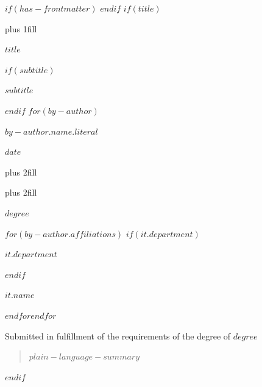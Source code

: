 $if(has-frontmatter)$
\frontmatter
$endif$
$if(title)$
\cleardoublepage
\thispagestyle{empty}
{\centering
\hbox{}\vskip 0cm plus 1fill
{\mytitlefont \Huge\bfseries $title$ \par}
$if(subtitle)$
\vspace{3ex}
{\Large\bfseries $subtitle$ \par}
$endif$
\vspace{6ex}
$for(by-author)$
{\Large\bfseries $by-author.name.literal$ \par}
\vspace{3ex}
{\bfseries\large $date$ \par}
\vskip 0cm plus 2fill
{ \par}
\vskip 0cm plus 2fill
{\bfseries\large $degree$ \par}
\vspace{3ex}
$for(by-author.affiliations)$%
$if(it.department)$%
{\bfseries\large $it.department$ \par}
\vspace{3ex}
$endif$%
{\bfseries\large $it.name$ \par}
$endfor$$endfor$%
\vspace{12ex}
{\small Submitted in fulfillment of the requirements
of the degree of $degree$ \par}
\pagebreak
\begin{quote}
\raggedright    
$plain-language-summary$
\end{quote}
}
$endif$